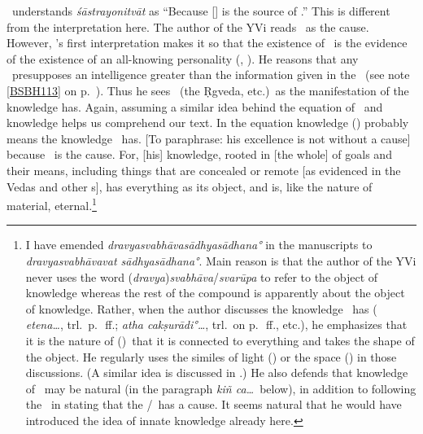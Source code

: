 {\Sankara\ understands  \emph{śāstrayonitvāt} as ``Because [\Brahman{}] is the source of \sastra.''  This is different from the interpretation here.  The author of the YVi reads \sastra\ as the cause.  However, \Sankara's first interpretation makes it so that the existence of \sastra\ is the evidence of the existence of an all-knowing personality (\sarvajna, \purusavisesa).  He reasons that any \sastra\ presupposes an intelligence greater than the information given in the \sastra\ (see note \ref{BSBH113} on p.~\pageref{BSBH113}).  Thus he sees \sastra\ (the Ṛgveda, etc.)\ as the manifestation of the knowledge \Brahman{} has.  Again, assuming a similar idea behind the equation of \sastra\ and knowledge helps us comprehend our text.  In the equation knowledge (\jnana) probably means the knowledge \Isvara\ has.}  [To paraphrase: his excellence is not without a cause] because \sastra\ is the cause.  For, [his] knowledge, rooted in [the whole] of goals and their means, including things that are concealed or remote [as evidenced in the Vedas and other \sastra\/s], has everything as its object, and is, like the nature of material, eternal.\footnote{I have emended \emph{dravyasvabhāvasādhyasādhana°} in the manuscripts to \emph{dravya\-sva\-bhāva\-vat sādhyasādhana°}.  Main reason is that the author of the YVi never uses the word (\emph{dravya})\emph{svabhāva}/\emph{svarūpa} to refer to the object of knowledge whereas the rest of the compound is apparently about the object of knowledge.  Rather, when the author discusses the knowledge \Isvara\ has ( \emph{etena\ldots}, trl.\ p.~\pageref{ETEN}\,ff.;  \emph{atha cakṣurādi°\ldots}, trl.\ on p.~\pageref{ATHACKS}\,ff., etc.), he emphasizes that it is the nature of (\citta)\sattva\ that it is connected to everything and takes the shape of the object.  He regularly uses the similes of light (\prakasa) or the space (\akasa) in those discussions.  (A similar idea is discussed in .)  He also defends that knowledge of \Isvara\ may be natural (in the paragraph \emph{kiñ ca\ldots}\ below), in addition to following the \bhasya\ in stating that the \sastra/\jnana\ has a cause.  It seems natural that he would have introduced the idea of innate knowledge already here.  %
}
